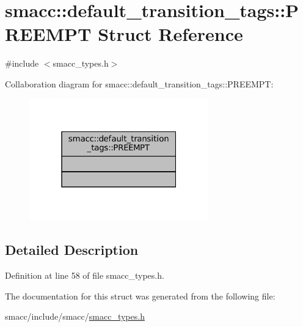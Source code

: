 \hypertarget{structsmacc_1_1default__transition__tags_1_1PREEMPT}{}\section{smacc\+:\+:default\+\_\+transition\+\_\+tags\+:\+:P\+R\+E\+E\+M\+PT Struct Reference}
\label{structsmacc_1_1default__transition__tags_1_1PREEMPT}


{\ttfamily \#include $<$smacc\+\_\+types.\+h$>$}



Collaboration diagram for smacc\+:\+:default\+\_\+transition\+\_\+tags\+:\+:P\+R\+E\+E\+M\+PT\+:
\nopagebreak
\begin{figure}[H]
\begin{center}
\leavevmode
\includegraphics[width=220pt]{structsmacc_1_1default__transition__tags_1_1PREEMPT__coll__graph}
\end{center}
\end{figure}


\subsection{Detailed Description}


Definition at line 58 of file smacc\+\_\+types.\+h.



The documentation for this struct was generated from the following file\+:\begin{DoxyCompactItemize}
\item 
smacc/include/smacc/\hyperlink{smacc__types_8h}{smacc\+\_\+types.\+h}\end{DoxyCompactItemize}
